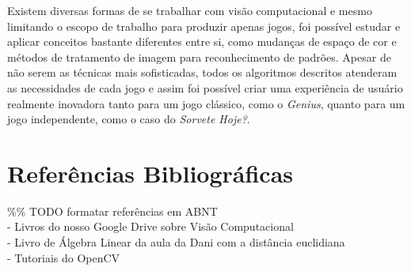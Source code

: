 \documentclass[a4paper]{article}
\begin{document}
Existem diversas formas de se trabalhar com visão computacional e mesmo limitando o escopo de trabalho para produzir apenas jogos, foi possível estudar e aplicar conceitos bastante diferentes entre si, como mudanças de espaço de cor e métodos de tratamento de imagem para reconhecimento de padrões. Apesar de não serem as técnicas mais sofisticadas, todos os algoritmos descritos atenderam as necessidades de cada jogo e assim foi possível criar uma experiência de usuário realmente inovadora tanto para um jogo clássico, como o \textit{Genius}, quanto para um jogo independente, como o caso do \textit{Sorvete Hoje?}. 


\section{ Referências Bibliográficas}


\%\% TODO formatar referências em ABNT \\
- Livros do nosso Google Drive sobre Visão Computacional \\
- Livro de Álgebra Linear da aula da Dani com a distância euclidiana \\
- Tutoriais do OpenCV \\


\break
\end{document}
